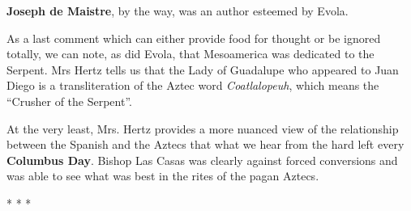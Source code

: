 \textbf{Joseph de Maistre}, by the way, was an author esteemed by Evola.

As a last comment which can either provide food for thought or be ignored totally, we can note, as did Evola, that Mesoamerica was dedicated to the Serpent. Mrs Hertz tells us that the Lady of Guadalupe who appeared to Juan Diego is a transliteration of the Aztec word \emph{Coatlalopeuh}, which means the ``Crusher of the Serpent''.

At the very least, Mrs. Hertz provides a more nuanced view of the relationship between the Spanish and the Aztecs that what we hear from the hard left every \textbf{Columbus Day}. Bishop Las Casas was clearly against forced conversions and was able to see what was best in the rites of the pagan Aztecs.



\begin{center}* * *\end{center}

